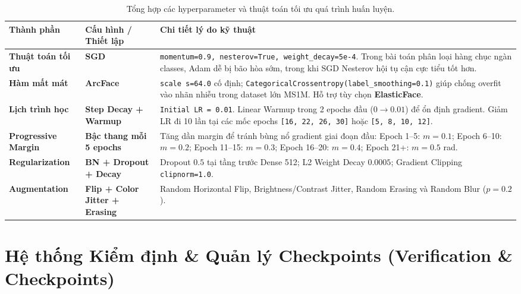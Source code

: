 \documentclass[11pt,a4paper]{article}
\begin{document}
\begin{table}[H]
\centering
\begin{tabularx}{\textwidth}{l l X}
\toprule
\textbf{Thành phần} & \textbf{Cấu hình / Thiết lập} & \textbf{Chi tiết lý do kỹ thuật} \\
\midrule
\textbf{Thuật toán tối ưu} & \textbf{SGD} & \texttt{momentum=0.9, nesterov=True, weight\_decay=5e-4}. Trong bài toán phân loại hàng chục ngàn classes, Adam dễ bị bão hòa sớm, trong khi SGD Nesterov hội tụ cận cực tiểu tốt hơn. \\
\midrule
\textbf{Hàm mất mát} & \textbf{ArcFace} & \texttt{scale s=64.0} cố định; \texttt{CategoricalCrossentropy(label\_smoothing=0.1)} giúp chống overfit vào nhãn nhiễu trong dataset lớn MS1M. Hỗ trợ tùy chọn \textbf{ElasticFace}. \\
\midrule
\textbf{Lịch trình học} & \textbf{Step Decay + Warmup} & \texttt{Initial LR = 0.01}. Linear Warmup trong 2 epochs đầu ($0 \to 0.01$) để ổn định gradient. Giảm LR đi 10 lần tại các mốc epochs \texttt{[16, 22, 26, 30]} hoặc \texttt{[5, 8, 10, 12]}. \\
\midrule
\textbf{Progressive Margin} & \textbf{Bậc thang mỗi 5 epochs} & Tăng dần margin để tránh bùng nổ gradient giai đoạn đầu: Epoch 1--5: $m=0.1$; Epoch 6--10: $m=0.2$; Epoch 11--15: $m=0.3$; Epoch 16--20: $m=0.4$; Epoch 21+: $m=0.5$ rad. \\
\midrule
\textbf{Regularization} & \textbf{BN + Dropout + Decay} & Dropout $0.5$ tại tầng trước Dense 512; L2 Weight Decay $0.0005$; Gradient Clipping \texttt{clipnorm=1.0}. \\
\midrule
\textbf{Augmentation} & \textbf{Flip + Color Jitter + Erasing} & Random Horizontal Flip, Brightness/Contrast Jitter, Random Erasing và Random Blur ($p=0.2$). \\
\bottomrule
\end{tabularx}
\caption{Tổng hợp các hyperparameter và thuật toán tối ưu quá trình huấn luyện.}
\end{table}

\section{Hệ thống Kiểm định \& Quản lý Checkpoints (Verification \& Checkpoints)}
\end{document}
